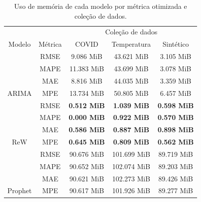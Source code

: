 \begin{table}[htbp]
    \caption{Uso de memória de cada modelo por métrica otimizada e coleção de dados.}\label{tab:memoria}
    \centering
    \begin{tabular}{@{}ccccc@{}} \toprule
                                  &                           & \multicolumn{3}{c}{Coleção de dados}                                                                 \\ \cmidrule{3-5}
        \multirow{-2}{*}{Modelo}  & \multirow{-2}{*}{Métrica} & \multicolumn{1}{c}{COVID}              & \multicolumn{1}{c}{Temperatura}        & Sintético          \\ \midrule
                                  & RMSE                      & \multicolumn{1}{c}{9.086 MiB}          & \multicolumn{1}{c}{43.621 MiB}         & 3.105 MiB          \\
                                  & MAPE                      & \multicolumn{1}{c}{11.383 MiB}         & \multicolumn{1}{c}{43.699 MiB}         & 3.078 MiB          \\
                                  & MAE                       & \multicolumn{1}{c}{8.816 MiB}          & \multicolumn{1}{c}{44.035 MiB}         & 3.359 MiB          \\
        \multirow{-4}{*}{ARIMA}   & MPE                       & \multicolumn{1}{c}{13.734 MiB}         & \multicolumn{1}{c}{50.805 MiB}         & 6.457 MiB          \\ \midrule
                                  & RMSE                      & \multicolumn{1}{c}{\textbf{0.512 MiB}} & \multicolumn{1}{c}{\textbf{1.039 MiB}} & \textbf{0.598 MiB} \\
                                  & MAPE                      & \multicolumn{1}{c}{\textbf{0.000 MiB}} & \multicolumn{1}{c}{\textbf{0.922 MiB}} & \textbf{0.570 MiB} \\
                                  & MAE                       & \multicolumn{1}{c}{\textbf{0.586 MiB}} & \multicolumn{1}{c}{\textbf{0.887 MiB}} & \textbf{0.898 MiB} \\
        \multirow{-4}{*}{ReW}     & MPE                       & \multicolumn{1}{c}{\textbf{0.645 MiB}} & \multicolumn{1}{c}{\textbf{0.809 MiB}} & \textbf{0.562 MiB} \\ \midrule
                                  & RMSE                      & \multicolumn{1}{c}{90.676 MiB}         & \multicolumn{1}{c}{101.699 MiB}        & 89.719 MiB         \\
                                  & MAPE                      & \multicolumn{1}{c}{90.652 MiB}         & \multicolumn{1}{c}{102.074 MiB}        & 89.203 MiB         \\
                                  & MAE                       & \multicolumn{1}{c}{90.621 MiB}         & \multicolumn{1}{c}{102.273 MiB}        & 89.426 MiB         \\
        \multirow{-4}{*}{Prophet} & MPE                       & \multicolumn{1}{c}{90.617 MiB}         & \multicolumn{1}{c}{101.926 MiB}        & 89.277 MiB         \\ \bottomrule
    \end{tabular}
\end{table}

